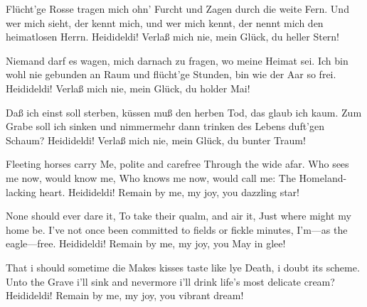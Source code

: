     \vspace*{\fill}
    \begin{poem}
    \begin{stanza}
    Flücht'ge Rosse tragen\verseline
    mich ohn' Furcht und Zagen\verseline
    durch die weite Fern.\verseline
    Und wer mich sieht, der kennt mich,\verseline
    und wer mich kennt, der nennt mich\verseline
    den heimatlosen Herrn.\verseline
    Heidideldi!\verseline
    Verlaß mich nie,\verseline
    mein Glück, du heller Stern!
    \end{stanza}
    \begin{stanza}
    Niemand darf es wagen,\verseline
    mich darnach zu fragen,\verseline
    wo meine Heimat sei.\verseline
    Ich bin wohl nie gebunden\verseline
    an Raum und flücht'ge Stunden,\verseline
    bin wie der Aar so frei.\verseline
    Heidideldi!\verseline
    Verlaß mich nie,\verseline
    mein Glück, du holder Mai!
    \end{stanza}
    \begin{stanza}
    Daß ich einst soll sterben,\verseline
    küssen muß den herben\verseline
    Tod, das glaub ich kaum.\verseline
    Zum Grabe soll ich sinken\verseline
    und nimmermehr dann trinken\verseline
    des Lebens duft'gen Schaum?\verseline
    Heidideldi!\verseline
    Verlaß mich nie,\verseline
    mein Glück, du bunter Traum!
    \end{stanza}
    \end{poem}
    \begin{poem}
    \begin{stanza}
    Fleeting horses carry\verseline
    Me, polite and carefree\verseline
    Through the wide afar.\verseline
    Who sees me now, would know me,\verseline
    Who knows me now, would call me:\verseline
    The Homeland-lacking heart.\verseline
    Heidideldi!\verseline
    Remain by me,\verseline
    my joy, you dazzling star!
    \end{stanza}
    \begin{stanza}
    None should ever dare it,\verseline
    To take their qualm, and air it,\verseline
    Just where might my home be.\verseline
    I've not once been committed\verseline
    to fields or fickle minutes,\verseline
    I'm---as the eagle---free.\verseline
    Heidideldi!\verseline
    Remain by me,\verseline
    my joy, you May in glee!
    \end{stanza}
    \begin{stanza}
    That i should sometime die\verseline
    Makes kisses taste like lye\verseline
    Death, i doubt its scheme.\verseline
    Unto the Grave i'll sink\verseline
    and nevermore i'll drink\verseline
    life's most delicate cream?\verseline
    Heidideldi!\verseline
    Remain by me,\verseline
    my joy, you vibrant dream!
    \end{stanza}
    \end{poem}
